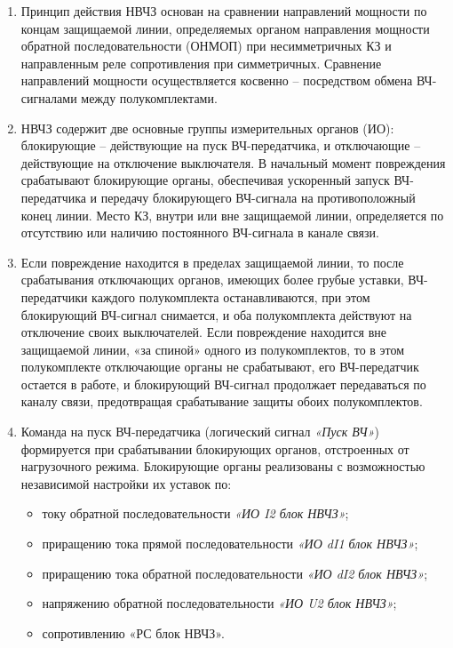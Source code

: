 \begin{enumerate}
\begin{enumerate}
\item
Принцип действия НВЧЗ основан на сравнении направлений мощности по концам защищаемой линии, определяемых органом направления мощности обратной последовательности (ОНМОП) при несимметричных КЗ и направленным реле сопротивления при симметричных.
Сравнение направлений мощности осуществляется косвенно – посредством обмена ВЧ-сигналами между полукомплектами. 

\item
НВЧЗ содержит две основные группы измерительных органов (ИО): блокирующие – действующие на пуск ВЧ-передатчика, и отключающие – действующие на отключение выключателя.
В начальный момент повреждения срабатывают блокирующие органы, обеспечивая ускоренный запуск ВЧ-передатчика и передачу блокирующего ВЧ-сигнала на противоположный конец линии.
Место КЗ, внутри или вне защищаемой линии, определяется по отсутствию или наличию постоянного ВЧ-сигнала в канале связи. 

\item
Если повреждение находится в пределах защищаемой линии, то после срабатывания отключающих органов, имеющих более грубые уставки, ВЧ-передатчики каждого полукомплекта останавливаются, при этом блокирующий ВЧ-сигнал снимается, и оба полукомплекта действуют на отключение своих выключателей.
Если повреждение находится вне защищаемой линии, «за спиной» одного из полукомплектов, то в этом полукомплекте отключающие органы не срабатывают, его ВЧ-передатчик остается в работе, и блокирующий ВЧ-сигнал продолжает передаваться по каналу связи, предотвращая срабатывание защиты обоих полукомплектов.

\item
Команда на пуск ВЧ-передатчика (логический сигнал \textit{«Пуск ВЧ»}) формируется при срабатывании блокирующих органов, отстроенных от нагрузочного режима.
Блокирующие органы реализованы с возможностью независимой настройки их уставок по:
\begin{itemize} 
\item току обратной последовательности \textit{«ИО I2 блок НВЧЗ»};
\item приращению тока прямой последовательности \textit{«ИО dI1 блок НВЧЗ»};
\item приращению тока обратной последовательности \textit{«ИО dI2 блок НВЧЗ»};
\item напряжению обратной последовательности \textit{«ИО U2 блок НВЧЗ»};
\item сопротивлению «РС блок НВЧЗ».
\end{itemize}


\end{enumerate}
\end{enumerate}
